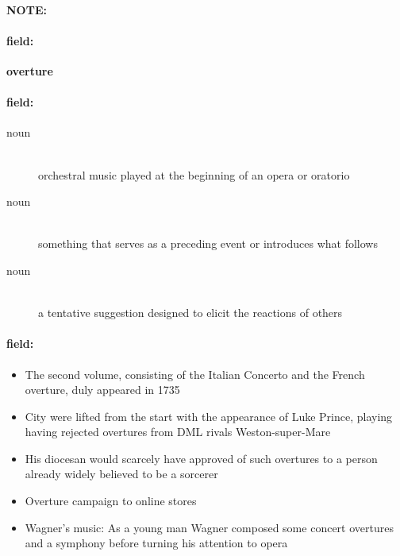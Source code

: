 \documentclass[12pt]{article}
\newenvironment{note}{\paragraph{NOTE:}}{}
\newenvironment{field}{\paragraph{field:}}{}
\begin{document}
\begin{note}
\begin{field}
\textbf{\large overture}
\end{field}


\begin{field}
\begin{description}
\item[noun] \hfill \\ 
orchestral music played at the beginning of an opera or oratorio

\item[noun] \hfill \\ 
something that serves as a preceding event or introduces what follows

\item[noun] \hfill \\ 
a tentative suggestion designed to elicit the reactions of others

\end{description}
\end{field}

\begin{field}
\begin{itemize}
\item The second volume, consisting of the Italian Concerto and the French overture, duly appeared in 1735
\item City were lifted from the start with the appearance of Luke Prince, playing having rejected overtures from DML rivals Weston-super-Mare
\item His diocesan would scarcely have approved of such overtures to a person already widely believed to be a sorcerer
\item Overture campaign to online stores
\item Wagner's music: As a young man Wagner composed some concert overtures and a symphony before turning his attention to opera
\end{itemize}
\end{field}
\end{note}
\end{document}

